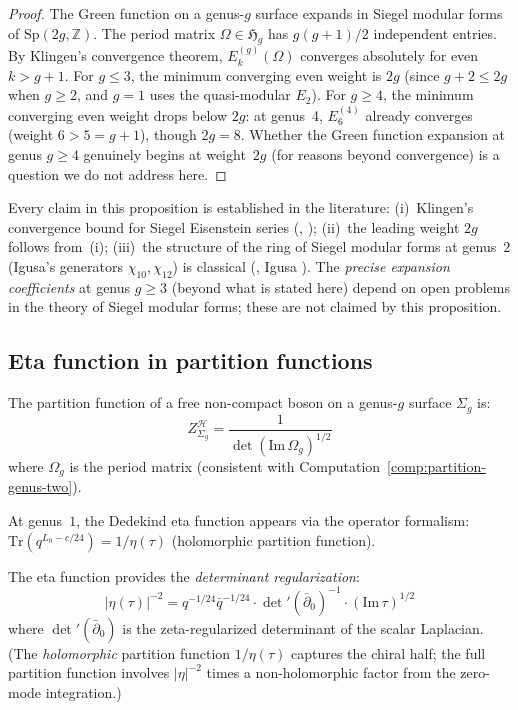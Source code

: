 \begin{proof}
The Green function on a genus-$g$ surface expands in Siegel modular forms of $\mathrm{Sp}(2g, \mathbb{Z})$.  The period matrix $\Omega \in \mathfrak{H}_g$ has $g(g+1)/2$ independent entries.  By Klingen's convergence theorem, $E_{k}^{(g)}(\Omega)$ converges absolutely for even $k > g+1$.  For $g \leq 3$, the minimum converging even weight is $2g$ (since $g+2 \leq 2g$ when $g \geq 2$, and $g=1$ uses the quasi-modular $E_2$).  For $g \geq 4$, the minimum converging even weight drops below $2g$: at genus~4, $E_6^{(4)}$ already converges (weight $6 > 5 = g+1$), though $2g = 8$.  Whether the Green function expansion at genus $g \geq 4$ genuinely begins at weight~$2g$ (for reasons beyond convergence) is a question we do not address here.
\end{proof}

\begin{remark}[Scope]
Every claim in this proposition is established in the literature:
(i)~Klingen's convergence bound for Siegel Eisenstein series
(\ClaimStatusProvedElsewhere, \cite{Klingen67});
(ii)~the leading weight $2g$ follows from~(i);
(iii)~the structure of the ring of Siegel modular forms at genus~$2$
(Igusa's generators $\chi_{10}, \chi_{12}$) is classical
(\ClaimStatusProvedElsewhere, Igusa \cite{Igusa62}).
The \emph{precise expansion coefficients} at genus $g \geq 3$
(beyond what is stated here) depend on open problems in the
theory of Siegel modular forms; these are not claimed by this
proposition.
\end{remark}

\subsection{Eta function in partition functions}
\label{subsec:eta-partition-functions}

\begin{theorem}\label{thm:eta-appearance}
The partition function of a free non-compact boson on a genus-$g$ surface $\Sigma_g$ is:
\begin{equation}
Z_{\Sigma_g}^{\mathcal{H}} = \frac{1}{\det(\mathrm{Im}\,\Omega_g)^{1/2}}
\end{equation}
where $\Omega_g$ is the period matrix (consistent with Computation~\ref{comp:partition-genus-two}).

At genus~$1$, the Dedekind eta function appears via the operator formalism: $\mathrm{Tr}(q^{L_0 - c/24}) = 1/\eta(\tau)$ (holomorphic partition function).

The eta function provides the \emph{determinant regularization}:
\[|\eta(\tau)|^{-2} = q^{-1/24}\bar{q}^{-1/24} \cdot \det'(\bar{\partial}_0)^{-1} \cdot (\mathrm{Im}\,\tau)^{1/2}\]
where $\det'(\bar{\partial}_0)$ is the zeta-regularized determinant of the
scalar Laplacian.  (The \emph{holomorphic} partition function $1/\eta(\tau)$
captures the chiral half; the full partition function involves $|\eta|^{-2}$
times a non-holomorphic factor from the zero-mode integration.)
\end{theorem}

